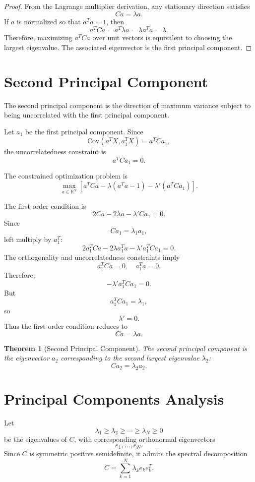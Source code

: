 \documentclass[12pt,oneside]{book}
\numberwithin{equation}{section}
\theoremstyle{definition}
\theoremstyle{plain}
\newtheorem{theorem}{Theorem}[section]
\theoremstyle{remark}
\newcommand{\R}{\mathbb{R}}
\newcommand{\Cov}{\mathrm{Cov}}
\begin{document}
\begin{proof}
From the Lagrange multiplier derivation, any stationary direction satisfies
\[
Ca=\lambda a.
\]
If $a$ is normalized so that $a^Ta=1$, then
\[
a^TCa
=
a^T\lambda a
=
\lambda a^Ta
=
\lambda.
\]
Therefore, maximizing $a^TCa$ over unit vectors is equivalent to choosing the largest eigenvalue. The associated eigenvector is the first principal component.
\end{proof}

\section{Second Principal Component}

The second principal component is the direction of maximum variance subject to being uncorrelated with the first principal component.

Let $a_1$ be the first principal component. Since
\[
\Cov(a^TX,a_1^TX)
=
a^TCa_1,
\]
the uncorrelatedness constraint is
\[
a^TCa_1=0.
\]

The constrained optimization problem is
\[
\max_{a \in \R^N}
\left[
a^TCa
-
\lambda(a^Ta-1)
-
\lambda'(a^TCa_1)
\right].
\]

The first-order condition is
\[
2Ca-2\lambda a-\lambda'Ca_1=0.
\]
Since
\[
Ca_1=\lambda_1a_1,
\]
left multiply by $a_1^T$:
\[
2a_1^TCa
-
2\lambda a_1^Ta
-
\lambda'a_1^TCa_1
=
0.
\]
The orthogonality and uncorrelatedness constraints imply
\[
a_1^TCa=0,
\quad
a_1^Ta=0.
\]
Therefore,
\[
-\lambda'a_1^TCa_1=0.
\]
But
\[
a_1^TCa_1=\lambda_1,
\]
so
\[
\lambda'=0.
\]
Thus the first-order condition reduces to
\[
Ca=\lambda a.
\]

\begin{theorem}[Second Principal Component]
The second principal component is the eigenvector $a_2$ corresponding to the second largest eigenvalue $\lambda_2$:
\[
Ca_2=\lambda_2a_2.
\]
\end{theorem}

\section{Principal Components Analysis}

Let
\[
\lambda_1 \geq \lambda_2 \geq \cdots \geq \lambda_N \geq 0
\]
be the eigenvalues of $C$, with corresponding orthonormal eigenvectors
\[
e_1,\dots,e_N.
\]
Since $C$ is symmetric positive semidefinite, it admits the spectral decomposition
\[
C
=
\sum_{k=1}^N \lambda_k e_ke_k^T.
\]
\end{document}

